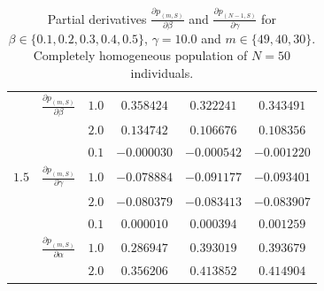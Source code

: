 \documentclass[10pt,A4paper]{article}
\begin{document}
\begin{table}[h]
\begin{tabular}{|c|c|c|c|c|c|}
\cline{3-6}
 & $\frac{\partial  p_{(m,S)}}{\partial \beta}$ & $1.0$ & $0.358424$ & $0.322241$ & $0.343491$ \\
\cline{3-6}
  & & $2.0$ & $0.134742$ & $0.106676$ & $0.108356$ \\
\cline{2-6}
 & & $0.1$ & $-0.000030$ & $-0.000542$ & $-0.001220$ \\
\cline{3-6}
$1.5$ & $\frac{\partial  p_{(m,S)}}{\partial \gamma}$ & $1.0$ & $-0.078884$ & $-0.091177$ & $-0.093401$ \\
\cline{3-6}
 &  & $2.0$ & $-0.080379$ & $-0.083413$ & $-0.083907$ \\
\cline{2-6}
 & & $0.1$ & $0.000010$ & $0.000394$ & $0.001259$ \\
\cline{3-6}
 & $\frac{\partial  p_{(m,S)}}{\partial \alpha}$ & $1.0$ & $0.286947$ & $0.393019$ & $0.393679$ \\
\cline{3-6}
 & & $2.0$ & $0.356206$ & $0.413852$ & $0.414904$ \\
\hline
\end{tabular}
\caption{Partial derivatives $\frac{\partial p_{(m,S)}}{\partial \beta}$ and $\frac{\partial p_{(N-1,S)}}{\partial \gamma}$ for $\beta\in\{0.1,0.2,0.3,0.4,0.5\}$, $\gamma=10.0$
and $m\in\{49,40,30\}$. Completely homogeneous population of $N=50$ individuals.}
\label{tab:4}
\end{table}
\end{document}
